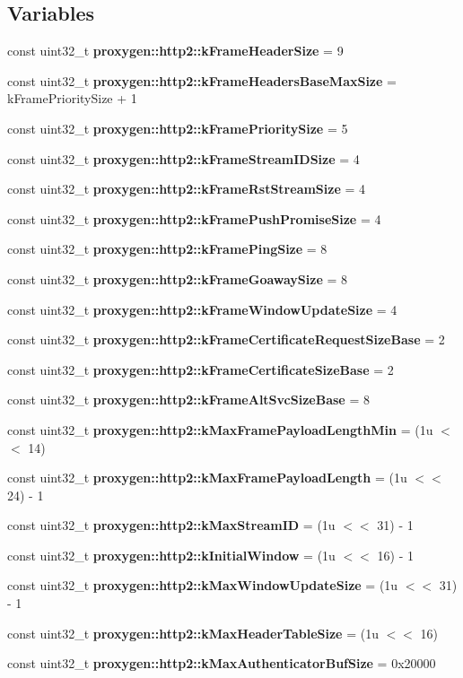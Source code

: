 \subsection*{Variables}
\begin{DoxyCompactItemize}
\item 
const uint32\+\_\+t {\bf proxygen\+::http2\+::k\+Frame\+Header\+Size} = 9
\item 
const uint32\+\_\+t {\bf proxygen\+::http2\+::k\+Frame\+Headers\+Base\+Max\+Size} = k\+Frame\+Priority\+Size + 1
\item 
const uint32\+\_\+t {\bf proxygen\+::http2\+::k\+Frame\+Priority\+Size} = 5
\item 
const uint32\+\_\+t {\bf proxygen\+::http2\+::k\+Frame\+Stream\+I\+D\+Size} = 4
\item 
const uint32\+\_\+t {\bf proxygen\+::http2\+::k\+Frame\+Rst\+Stream\+Size} = 4
\item 
const uint32\+\_\+t {\bf proxygen\+::http2\+::k\+Frame\+Push\+Promise\+Size} = 4
\item 
const uint32\+\_\+t {\bf proxygen\+::http2\+::k\+Frame\+Ping\+Size} = 8
\item 
const uint32\+\_\+t {\bf proxygen\+::http2\+::k\+Frame\+Goaway\+Size} = 8
\item 
const uint32\+\_\+t {\bf proxygen\+::http2\+::k\+Frame\+Window\+Update\+Size} = 4
\item 
const uint32\+\_\+t {\bf proxygen\+::http2\+::k\+Frame\+Certificate\+Request\+Size\+Base} = 2
\item 
const uint32\+\_\+t {\bf proxygen\+::http2\+::k\+Frame\+Certificate\+Size\+Base} = 2
\item 
const uint32\+\_\+t {\bf proxygen\+::http2\+::k\+Frame\+Alt\+Svc\+Size\+Base} = 8
\item 
const uint32\+\_\+t {\bf proxygen\+::http2\+::k\+Max\+Frame\+Payload\+Length\+Min} = (1u $<$$<$ 14)
\item 
const uint32\+\_\+t {\bf proxygen\+::http2\+::k\+Max\+Frame\+Payload\+Length} = (1u $<$$<$ 24) -\/ 1
\item 
const uint32\+\_\+t {\bf proxygen\+::http2\+::k\+Max\+Stream\+ID} = (1u $<$$<$ 31) -\/ 1
\item 
const uint32\+\_\+t {\bf proxygen\+::http2\+::k\+Initial\+Window} = (1u $<$$<$ 16) -\/ 1
\item 
const uint32\+\_\+t {\bf proxygen\+::http2\+::k\+Max\+Window\+Update\+Size} = (1u $<$$<$ 31) -\/ 1
\item 
const uint32\+\_\+t {\bf proxygen\+::http2\+::k\+Max\+Header\+Table\+Size} = (1u $<$$<$ 16)
\item 
const uint32\+\_\+t {\bf proxygen\+::http2\+::k\+Max\+Authenticator\+Buf\+Size} = 0x20000
\end{DoxyCompactItemize}

